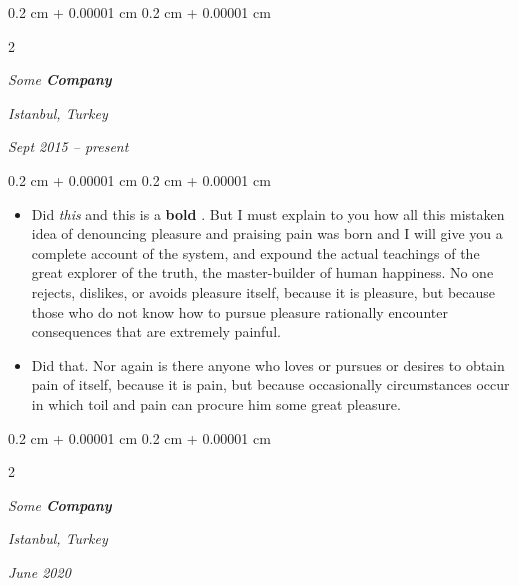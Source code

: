\documentclass[10pt, letterpaper]{article}
\newenvironment{highlights}{
    \begin{itemize}[
        topsep=0.10 cm,
        parsep=0.10 cm,
        partopsep=0pt,
        itemsep=0pt,
        leftmargin=0.4 cm + 10pt
    ]
}{
    \end{itemize}
} %
\newenvironment{onecolentry}{
    \begin{adjustwidth}{
        0.2 cm + 0.00001 cm
    }{
        0.2 cm + 0.00001 cm
    }
}{
    \end{adjustwidth}
} %
\newenvironment{twocolentry}[2][]{
    \onecolentry
    \def\secondColumn{#2}
    \setcolumnwidth{\fill, 4.5 cm}
    \begin{paracol}{2}
}{
    \switchcolumn \raggedleft \secondColumn
    \end{paracol}
    \endonecolentry
} %
\let\hrefWithoutArrow\href
\renewcommand{\href}[2]{\hrefWithoutArrow{#1}{\ifthenelse{\equal{#2}{}}{ }{#2 }\raisebox{.15ex}{\footnotesize \faExternalLink*}}}
\begin{document}
        \vspace{0.2 cm}

            \begin{twocolentry}{
        \textit{Istanbul, Turkey}

        \textit{Sept 2015 – present}    }
                \textbf{}

                \textit{Some \textbf{Company}}
            \end{twocolentry}

        \vspace{0.10 cm}
        \begin{onecolentry}
            \begin{highlights}
                \item Did \textit{this} and this is a \textbf{bold} \href{https://example.com}{link}. But I must explain to you how all this mistaken idea of denouncing pleasure and praising pain was born and I will give you a complete account of the system, and expound the actual teachings of the great explorer of the truth, the master-builder of human happiness. No one rejects, dislikes, or avoids pleasure itself, because it is pleasure, but because those who do not know how to pursue pleasure rationally encounter consequences that are extremely painful.
                \item Did that. Nor again is there anyone who loves or pursues or desires to obtain pain of itself, because it is pain, but because occasionally circumstances occur in which toil and pain can procure him some great pleasure.
            \end{highlights}
        \end{onecolentry}


        \vspace{0.2 cm}

            \begin{twocolentry}{
        \textit{Istanbul, Turkey}

        \textit{June 2020}    }
                \textbf{}

                \textit{Some \textbf{Company}}
            \end{twocolentry}
\end{document}
